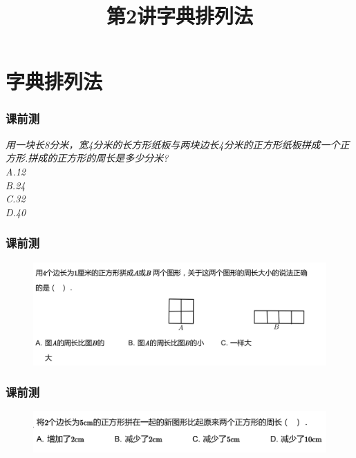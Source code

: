 \section{字典排列法}

\title[第2讲\quad 字典排列法]{第2讲\quad 字典排列法} 
\author{}
\date{}
\begin{frame}
    \titlepage
\end{frame}

\begin{frame}
    \frametitle{课前测}
    \vspace*{-2cm}
    \textit{用一块长8分米，宽4分米的长方形纸板与两块边长4分米的正方形纸板拼成一个正方形.拼成的正方形的周长是多少分米?\\}
    \textit{A.12\\ B.24\\ C.32\\ D.40}
\end{frame}

\begin{frame}
    \frametitle{课前测}
    \vspace*{-2cm}
    \begin{figure}[H] 
        \centering
        \includegraphics[width=1\textwidth]{./pics/Chapter_2/keqian2.png}
    \end{figure}
\end{frame}

\begin{frame}
    \frametitle{课前测}
    \vspace*{-2cm}
    \begin{figure}[H] 
        \centering
        \includegraphics[width=1\textwidth]{./pics/Chapter_2/keqian3.png}
    \end{figure}
\end{frame}

